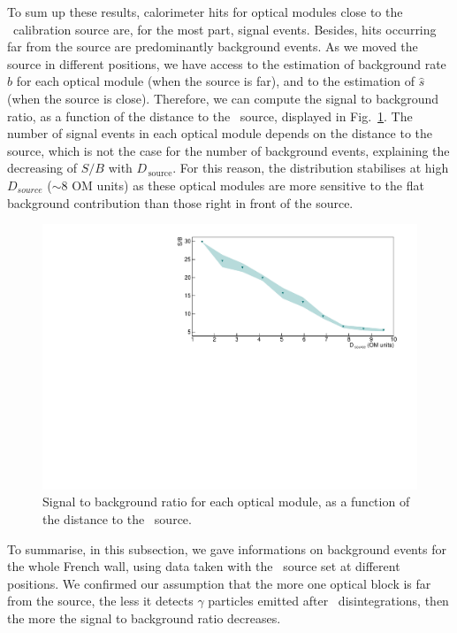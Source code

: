 To sum up these results, calorimeter hits for optical modules close to the \Co\ calibration source are, for the most part, signal events.
Besides, hits occurring far from the source are predominantly background events.
As we moved the source in different positions, we have access to the estimation of background rate $\hat{b}$ for each optical module (when the source is far), and to the estimation of $\hat{s}$ (when the source is close).
Therefore, we can compute the signal to background ratio, as a function of the distance to the \Co\ source, displayed in Fig.~\ref{fig:Co_ratioSB}.
The number of signal events in each optical module depends on the distance to the source, which is not the case for the number of background events, explaining the decreasing of $S/B$ with $D_{\,\text{source}}$.
For this reason, the distribution stabilises at high $D_{source}$ ($\sim8$ OM units) as these optical modules are more sensitive to the flat background contribution than those right in front of the source.
\begin{figure}[h]
  \centering
  \includegraphics[width=1.1\textwidth]{commissioning/fig_commissioning/Co_ratioSB_distance.pdf}
  \caption{Signal to background ratio for each optical module, as a function of the distance to the \Co\ source.
    \label{fig:Co_ratioSB}}
\end{figure}


To summarise, in this subsection, we gave informations on background events for the whole French wall, using data taken with the \Co\ source set at different positions.
We confirmed our assumption that the more one optical block is far from the source, the less it detects $\gamma$ particles emitted after \Co\ disintegrations, then the more the signal to background ratio decreases.

